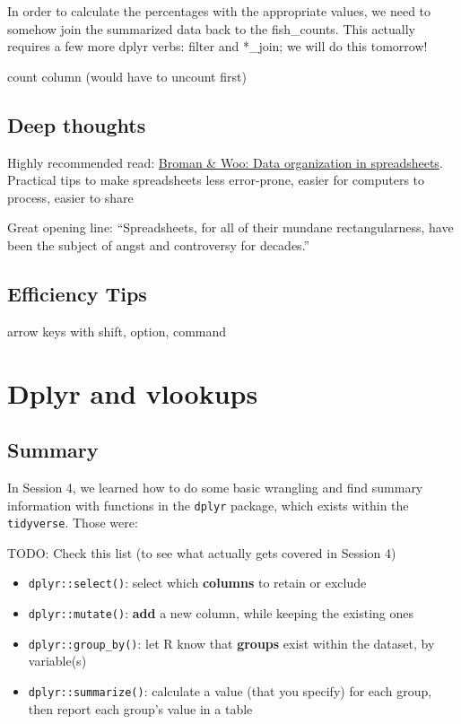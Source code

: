 \documentclass[]{book}
\providecommand{\tightlist}{%
  \setlength{\itemsep}{0pt}\setlength{\parskip}{0pt}}
\begin{document}
In order to calculate the percentages with the appropriate values, we need to somehow join the summarized data back to the fish\_counts. This actually requires a few more dplyr verbs: filter and *\_join; we will do this tomorrow!

count column (would have to uncount first)

\hypertarget{deep-thoughts}{%
\section{Deep thoughts}\label{deep-thoughts}}

Highly recommended read: \href{https://peerj.com/preprints/3183/}{Broman \& Woo: Data organization in spreadsheets}. Practical tips to make spreadsheets less error-prone, easier for computers to process, easier to share

Great opening line: ``Spreadsheets, for all of their mundane rectangularness, have been the subject of angst and controversy for decades.''

\hypertarget{efficiency-tips-3}{%
\section{Efficiency Tips}\label{efficiency-tips-3}}

arrow keys with shift, option, command

\hypertarget{vlookup}{%
\chapter{Dplyr and vlookups}\label{vlookup}}

\hypertarget{summary-1}{%
\section{Summary}\label{summary-1}}

In Session 4, we learned how to do some basic wrangling and find summary information with functions in the \texttt{dplyr} package, which exists within the \texttt{tidyverse}. Those were:

TODO: Check this list (to see what actually gets covered in Session 4)

\begin{itemize}
\tightlist
\item
  \texttt{dplyr::select()}: select which \textbf{columns} to retain or exclude
\item
  \texttt{dplyr::mutate()}: \textbf{add} a new column, while keeping the existing ones
\item
  \texttt{dplyr::group\_by()}: let R know that \textbf{groups} exist within the dataset, by variable(s)
\item
  \texttt{dplyr::summarize()}: calculate a value (that you specify) for each group, then report each group's value in a table
\end{itemize}
\end{document}
